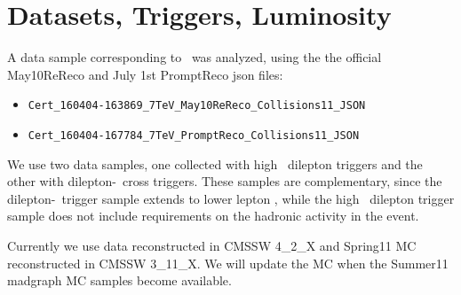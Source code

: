 \section{Datasets, Triggers, Luminosity}
\label{sec:datasets}

A data sample corresponding to \lumi\  was analyzed, using the the official May10ReReco and July 1st PromptReco json files: 
\begin{itemize}
  \item \verb=Cert_160404-163869_7TeV_May10ReReco_Collisions11_JSON=
  \item \verb=Cert_160404-167784_7TeV_PromptReco_Collisions11_JSON=
\end{itemize}

We use two data samples, one collected with high \pt\ dilepton triggers and the other 
with dilepton-\Ht\ cross triggers. These samples are complementary, since the dilepton-\Ht\
trigger sample extends to lower lepton \pt, while the high \pt\ dilepton trigger sample 
does not include requirements on the hadronic activity in the event. 

Currently we use data reconstructed in CMSSW 4\_2\_X and Spring11 MC reconstructed in CMSSW 3\_11\_X.
We will update the MC  when the Summer11 madgraph MC samples become available.

